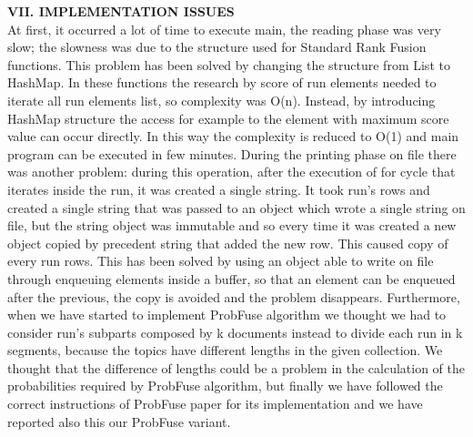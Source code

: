 \documentclass[12pt,journal]{IEEEtran}
\begin{document}
\textbf{VII. IMPLEMENTATION ISSUES} \\
At first, it occurred a lot of time to execute main, the reading phase was very slow; the slowness was due to the structure used for Standard Rank Fusion functions. This problem has been solved by changing the structure from List to HashMap. 
In these functions the research by score of run elements needed to iterate all run elements list, so complexity was O(n). Instead, by introducing HashMap structure the access for example to the element with maximum score value can occur directly. In this way the complexity is reduced to O(1) and main program can be executed in few minutes. 
During the printing phase on file there was another problem: during this operation, after the execution of for cycle that iterates inside the run, it was created a single string. It took run’s rows and created a single string that was passed to an object which wrote a single string on file, but the string object was immutable and so every time it was created a new object copied by precedent string that added the new row. This caused copy of every run rows. This has been solved by using an object able to write on file through enqueuing elements inside a buffer, so that an element can be enqueued after the previous, the copy is avoided and the problem disappears.
Furthermore, when we have started to implement ProbFuse algorithm we thought we had to consider run's subparts composed by k documents instead to divide each run in k segments, because the topics have different lengths in the given collection. We thought that the difference of lengths could be a problem in the calculation of the probabilities required by ProbFuse algorithm, but finally we have followed the correct instructions of ProbFuse paper for its implementation and we have reported also this our ProbFuse variant. 
 \\
\end{document}
